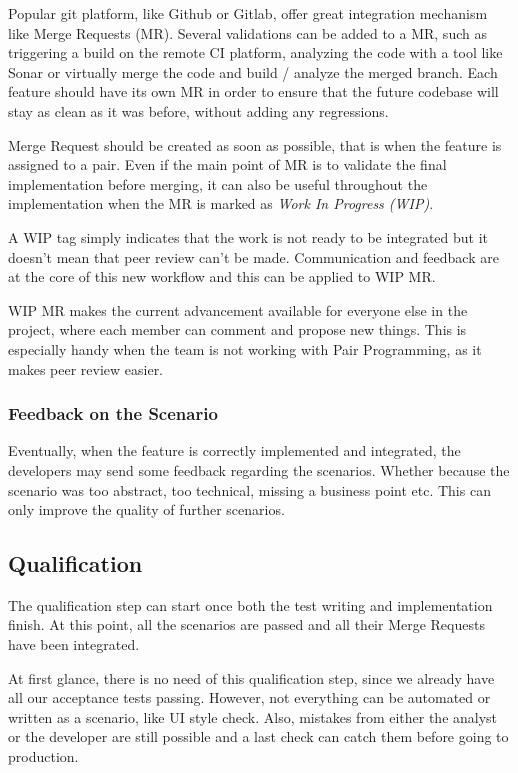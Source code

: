 Popular git platform, like Github or Gitlab, offer great integration
mechanism like Merge Requests (MR).
Several validations can be added to a MR, such as triggering a build on the
remote CI platform, analyzing the code with a tool like Sonar or virtually
merge the code and build / analyze the merged branch.
Each feature should have its own MR in order to ensure that the future
codebase will stay as clean as it was before, without adding any regressions.

Merge Request should be created as soon as possible, that is when the
feature is assigned to a pair.
Even if the main point of MR is to validate the final implementation before
merging, it can also be useful throughout the implementation when the MR is
marked as \textit{Work In Progress (WIP)}.

A WIP tag simply indicates that the work is not ready to be integrated but
it doesn't mean that peer review can't be made.
Communication and feedback are at the core of this new workflow and this can
be applied to WIP MR\@.

WIP MR makes the current advancement available for everyone else in the
project, where each member can comment and propose new things.
This is especially handy when the team is not working with Pair Programming,
as it makes peer review easier.

\subsubsection{Feedback on the Scenario}
Eventually, when the feature is correctly implemented and integrated, the
developers may send some feedback regarding the scenarios.
Whether because the scenario was too abstract, too technical, missing a
business point etc.
This can only improve the quality of further scenarios.

\subsection{Qualification}\label{subsec:qualification}
The qualification step can start once both the test writing and
implementation finish.
At this point, all the scenarios are passed and all their Merge Requests have
been integrated.

At first glance, there is no need of this qualification step, since we
already have all our acceptance tests passing.
However, not everything can be automated or written as a scenario, like UI
style check.
Also, mistakes from either the analyst or the developer are still possible
and a last check can catch them before going to production.

